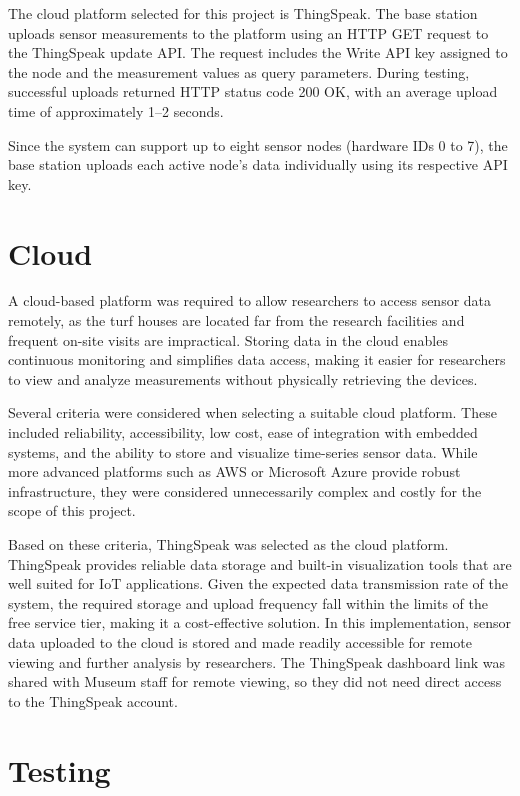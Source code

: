 The cloud platform selected for this project is ThingSpeak. The base station uploads sensor measurements to the platform using an HTTP GET request to the ThingSpeak update API. The request includes the Write API key assigned to the node and the measurement values as query parameters. During testing, successful uploads returned HTTP status code 200 OK, with an average upload time of approximately 1--2 seconds.


Since the system can support up to eight sensor nodes (hardware IDs 0 to 7), the base station uploads each active node's data individually using its respective API key.


\section{\texorpdfstring{Cloud}{Cloud}}

A cloud-based platform was required to allow researchers to access
sensor data remotely, as the turf houses are located far from the
research facilities and frequent on-site visits are impractical. Storing
data in the cloud enables continuous monitoring and simplifies data
access, making it easier for researchers to view and analyze
measurements without physically retrieving the devices.

Several criteria were considered when selecting a suitable cloud
platform. These included reliability, accessibility, low cost, ease of
integration with embedded systems, and the ability to store and
visualize time-series sensor data. While more advanced platforms such as
AWS or Microsoft Azure provide robust infrastructure, they were
considered unnecessarily complex and costly for the scope of this
project.

Based on these criteria, ThingSpeak was selected as the cloud platform.
ThingSpeak provides reliable data storage and built-in visualization
tools that are well suited for IoT applications. Given the expected data
transmission rate of the system, the required storage and upload
frequency fall within the limits of the free service tier, making it a
cost-effective solution. In this implementation, sensor data uploaded to
the cloud is stored and made readily accessible for remote viewing and
further analysis by researchers. The ThingSpeak dashboard link was shared with Museum staff for remote viewing, so they did not need direct access to the ThingSpeak account.

\section{Testing}


